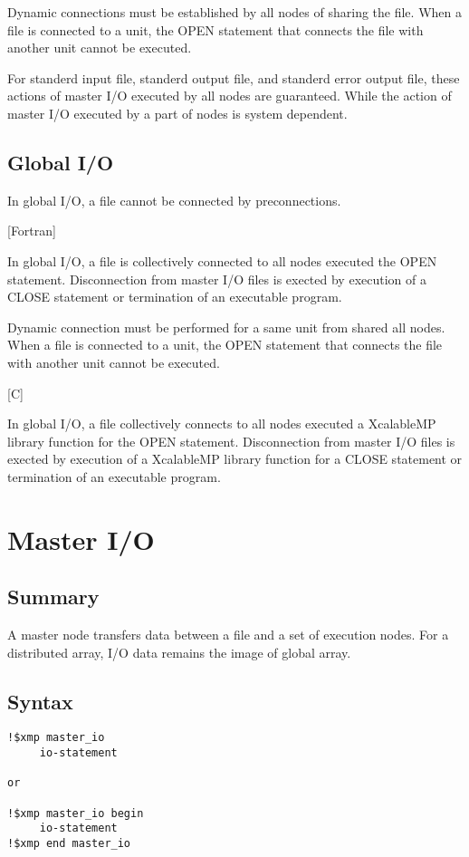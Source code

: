   Dynamic connections must be established by all nodes of sharing the
  file.
  When a file is connected to a unit, the OPEN statement that connects
  the file with another unit cannot be executed.

  For standerd input file, standerd output file, and standerd error
  output file, these actions of master I/O executed by all nodes are
  guaranteed.
  While the action of master I/O executed by a part of nodes is
  system dependent.


  \subsection{Global I/O}

  In global I/O, a file cannot be connected by preconnections.

  [Fortran]

  In global I/O, a file is collectively connected to all nodes executed the
  OPEN statement.
  Disconnection from master I/O files is exected by execution of a CLOSE
  statement or termination of an executable program.

  Dynamic connection must be performed for a same unit from shared all
  nodes.
  When a file is connected to a unit, the OPEN statement that connects
  the file with another unit cannot be executed.


  [C]

  In global I/O, a file collectively connects to all nodes executed a
  XcalableMP library function for the OPEN statement.
  Disconnection from master I/O files is exected by execution of a
  XcalableMP library function for a CLOSE statement or termination of an
  executable program.
  

  \section{Master I/O}

  \subsection{Summary}
  A master node transfers data between a file and a set of execution nodes.
  For a distributed array, I/O data remains the image of global array.

  \subsection{Syntax}
  \begin{verbatim}
!$xmp master_io
     io-statement

or

!$xmp master_io begin
     io-statement
!$xmp end master_io   
  \end{verbatim}
   
